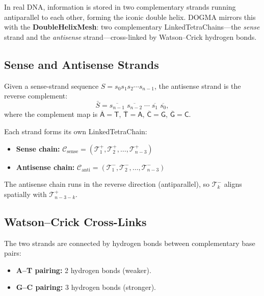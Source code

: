 In real DNA, information is stored in two complementary strands running
antiparallel to each other, forming the iconic double helix. DOGMA mirrors this
with the \textbf{DoubleHelixMesh}: two complementary LinkedTetraChains---the
\emph{sense} strand and the \emph{antisense} strand---cross-linked by
Watson--Crick hydrogen bonds.

\subsection{Sense and Antisense Strands}

Given a sense-strand sequence $S = s_0 s_1 s_2 \cdots s_{n-1}$, the antisense
strand is the reverse complement:
\begin{equation}
  \bar{S} = \overline{s_{n-1}}\;\overline{s_{n-2}}\;\cdots\;\overline{s_1}\;\overline{s_0},
\end{equation}
where the complement map is $\overline{\mathsf{A}} = \mathsf{T}$,
$\overline{\mathsf{T}} = \mathsf{A}$, $\overline{\mathsf{C}} = \mathsf{G}$,
$\overline{\mathsf{G}} = \mathsf{C}$.

Each strand forms its own LinkedTetraChain:
\begin{itemize}[leftmargin=1.8em]
  \item \textbf{Sense chain:} $\mathcal{C}_{\text{sense}} = (\mathcal{T}_1^{+}, \mathcal{T}_2^{+}, \ldots, \mathcal{T}_{n-3}^{+})$
  \item \textbf{Antisense chain:} $\mathcal{C}_{\text{anti}} = (\mathcal{T}_1^{-}, \mathcal{T}_2^{-}, \ldots, \mathcal{T}_{n-3}^{-})$
\end{itemize}

The antisense chain runs in the reverse direction (antiparallel), so
$\mathcal{T}_k^{-}$ aligns spatially with $\mathcal{T}_{n-3-k}^{+}$.

\subsection{Watson--Crick Cross-Links}

The two strands are connected by hydrogen bonds between complementary base pairs:

\begin{itemize}[leftmargin=1.8em]
  \item \textbf{A--T pairing:} 2 hydrogen bonds (weaker).
  \item \textbf{G--C pairing:} 3 hydrogen bonds (stronger).
\end{itemize}

